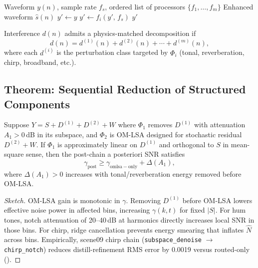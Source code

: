 \begin{algorithm}[H]
  \caption{Mixed-algorithm chain execution (\texttt{apply\_chain})}
  \label{alg:apply_chain}
  \begin{algorithmic}[1]
    \Require Waveform $y(n)$, sample rate $f_s$, ordered list of processors $\{f_1,\ldots,f_m\}$
    \Ensure Enhanced waveform $\hat{s}(n)$
    \State $y' \gets y$
      \State $y' \gets f_i(y',\, f_s)$ 
    \EndFor
    \State \Return $y'$
  \end{algorithmic}
\end{algorithm}

\begin{definition}
\label{def:physics_match}
Interference $d(n)$ admits a physics-matched decomposition if
\begin{equation}
  d(n) = d^{(1)}(n) + d^{(2)}(n) + \cdots + d^{(m)}(n),
\end{equation}
where each $d^{(i)}$ is the perturbation class targeted by $\Phi_i$ (tonal, reverberation, chirp, broadband, etc.).
\end{definition}

\subsection{Theorem: Sequential Reduction of Structured Components}

\begin{theorem}
\label{thm:chain}
Suppose $Y=S+D^{(1)}+D^{(2)}+W$ where $\Phi_1$ removes $D^{(1)}$ with attenuation $A_1>0$\,dB in its subspace, and $\Phi_2$ is OM-LSA designed for stochastic residual $D^{(2)}+W$. If $\Phi_1$ is approximately linear on $D^{(1)}$ and orthogonal to $S$ in mean-square sense, then the post-chain a posteriori SNR satisfies
\begin{equation}
  \gamma_{\mathrm{post}} \ge \gamma_{\mathrm{omlsa-only}} + \Delta(A_1),
\end{equation}
where $\Delta(A_1)>0$ increases with tonal/reverberation energy removed before OM-LSA.
\end{theorem}

\begin{proof}[Sketch]
OM-LSA gain is monotonic in $\gamma$. Removing $D^{(1)}$ before OM-LSA lowers effective noise power in affected bins, increasing $\gamma(k,t)$ for fixed $|S|$. For hum tones, notch attenuation of 20--40\,dB at harmonics directly increases local SNR in those bins. For chirp, ridge cancellation prevents energy smearing that inflates $\hat{N}$ across bins. Empirically, scene09 chirp chain (\texttt{subspace\_denoise} $\rightarrow$ \texttt{chirp\_notch}) reduces distill-refinement RMS error by 0.0019 versus routed-only ().
\end{proof}

